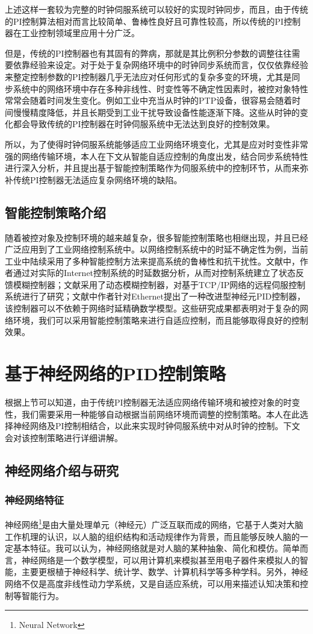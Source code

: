 上述这样一套较为完整的时钟伺服系统可以较好的实现时钟同步，而且，由于传统的PI控制算法相对而言比较简单、鲁棒性良好且可靠性较高，所以传统的PI控制器在工业控制领域里应用十分广泛。

但是，传统的PI控制器也有其固有的弊病，那就是其比例积分参数的调整往往需要依靠经验来设定。对于处于复杂网络环境中的时钟同步系统而言，仅仅依靠经验来整定控制参数的PI控制器几乎无法应对任何形式的复杂多变的环境，尤其是同步系统中的网络环境中存在多种非线性、时变性等不确定性因素时，被控对象特性常常会随着时间发生变化。例如工业中充当从时钟的PTP设备，很容易会随着时间慢慢精度降低，并且长期受到工业干扰导致设备性能逐渐下降。这些从时钟的变化都会导致传统的PI控制器在时钟伺服系统中无法达到良好的控制效果。

所以，为了使得时钟伺服系统能够适应工业网络环境变化，尤其是应对时变性非常强的网络传输环境，本人在下文从智能自适应控制的角度出发，结合同步系统特性进行深入分析，并且提出基于智能控制策略作为伺服系统中的控制环节，从而来弥补传统PI控制器无法适应复杂网络环境的缺陷。

\subsection{智能控制策略介绍}
随着被控对象及控制环境的越来越复杂，很多智能控制策略也相继出现，并且已经广泛应用到了工业网络控制系统中。以网络控制系统中的时延不确定性为例，当前工业中陆续采用了多种智能控制方法来提高系统的鲁棒性和抗干扰性\supercite{19,20}。文献\parencite{21}中，作者通过对实际的Internet控制系统的时延数据分析，从而对控制系统建立了状态反馈模糊控制器；文献\parencite{22}采用了动态模糊控制器，对基于TCP/IP网络的远程伺服控制系统进行了研究；文献\parencite{23}中作者针对Ethernet提出了一种改进型神经元PID控制器，该控制器可以不依赖于网络时延精确数学模型。这些研究成果都表明对于复杂的网络环境，我们可以采用智能控制策略来进行自适应控制，而且能够取得良好的控制效果。

\section{基于神经网络的PID控制策略}
根据上节可以知道，由于传统PI控制器无法适应网络传输环境和被控对象的时变性，我们需要采用一种能够自动根据当前网络环境而调整的控制策略。本人在此选择神经网络及PI控制相结合，以此来实现时钟伺服系统中对从时钟的控制。下文会对该控制策略进行详细讲解。

\subsection{神经网络介绍与研究}
\subsubsection{神经网络特征}
神经网络\footnote{Neural Network}是由大量处理单元（神经元）广泛互联而成的网络，它基于人类对大脑工作机理的认识，以人脑的组织结构和活动规律作为背景，而且能够反映人脑的一定基本特征。我可以认为，神经网络就是对人脑的某种抽象、简化和模仿。简单而言，神经网络是一个数学模型，可以用计算机来模拟甚至用电子器件来模拟人的智能，主要更根植于神经科学、统计学、数学、计算机科学等多种学科。另外，神经网络不仅是高度非线性动力学系统，又是自适应系统，可以用来描述认知决策和控制等智能行为。

